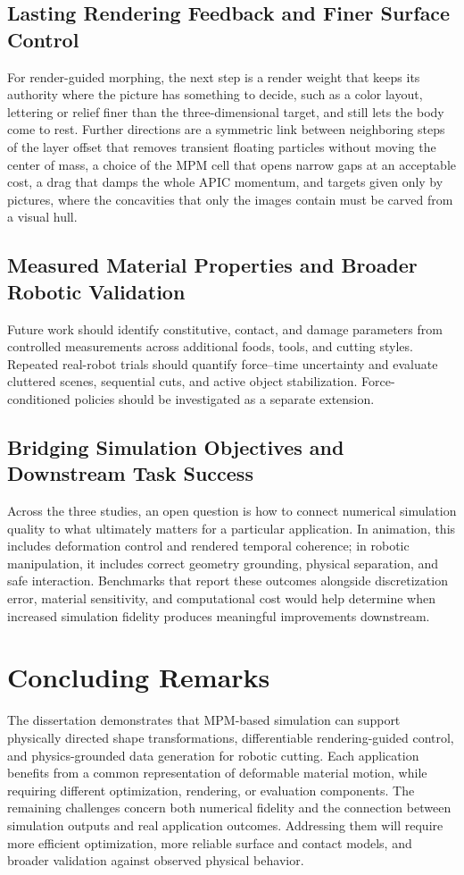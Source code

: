 \subsection{Lasting Rendering Feedback and Finer Surface Control}
For render-guided morphing, the next step is a render weight that keeps its authority where the picture has something to decide, such as a color layout, lettering or relief finer than the three-dimensional target, and still lets the body come to rest. Further directions are a symmetric link between neighboring steps of the layer offset that removes transient floating particles without moving the center of mass, a choice of the MPM cell that opens narrow gaps at an acceptable cost, a drag that damps the whole APIC momentum, and targets given only by pictures, where the concavities that only the images contain must be carved from a visual hull.

\subsection{Measured Material Properties and Broader Robotic Validation}
Future work should identify constitutive, contact, and damage parameters from controlled measurements across additional foods, tools, and cutting styles. Repeated real-robot trials should quantify force--time uncertainty and evaluate cluttered scenes, sequential cuts, and active object stabilization. Force-conditioned policies should be investigated as a separate extension.

\subsection{Bridging Simulation Objectives and Downstream Task Success}
Across the three studies, an open question is how to connect numerical simulation quality to what ultimately matters for a particular application. In animation, this includes deformation control and rendered temporal coherence; in robotic manipulation, it includes correct geometry grounding, physical separation, and safe interaction. Benchmarks that report these outcomes alongside discretization error, material sensitivity, and computational cost would help determine when increased simulation fidelity produces meaningful improvements downstream.

\section{Concluding Remarks}
The dissertation demonstrates that MPM-based simulation can support physically directed shape transformations, differentiable rendering-guided control, and physics-grounded data generation for robotic cutting. Each application benefits from a common representation of deformable material motion, while requiring different optimization, rendering, or evaluation components. The remaining challenges concern both numerical fidelity and the connection between simulation outputs and real application outcomes. Addressing them will require more efficient optimization, more reliable surface and contact models, and broader validation against observed physical behavior.
